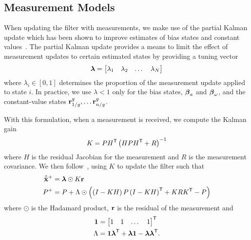 
\subsection{Measurement Models}
\label{sec:measurement_models}

When
updating the filter with measurements, we make use of the partial Kalman update
which has been shown to improve estimates of bias states and constant values~\cite{brink2017partial}. The partial Kalman update provides a
means to limit the effect of measurement updates to certain estimated
states by providing a tuning vector
\begin{equation}
  \boldsymbol{\mathrm{\lambda}} =
\begin{bmatrix}
  \lambda_1 & \lambda_2 & \dots & \lambda_N
\end{bmatrix}
\end{equation}
where $\lambda_i \in \left[ 0, 1\right]$ determines the proportion of the
measurement update applied to state $i$.
In practice, we use $\lambda < 1$ only for the
bias states, $\boldsymbol{\mathrm{\beta}}_a$ and $\boldsymbol{\mathrm{\beta}}_\omega$, and the
constant-value states $\vect{r}_{1/g}^{g}, \dots \vect{r}_{n/g}^{g}$.

With this formulation,
when a measurement is received, we compute the Kalman gain
\begin{equation}
  K = P H^{\mathsf{T}} \left(H P H^{\mathsf{T}} + R \right)^{-1}
\end{equation}
where $H$ is the residual Jacobian for the measurement and $R$ is the
measurement covariance. We then follow~\cite{brink2017partial}, using $K$ to update the filter such that
\begin{align}
  \hat{\tilde{\boldsymbol{\mathrm{x}}}}^{+} &= \boldsymbol{\mathrm{\lambda}} \odot K \boldsymbol{\mathrm{r}} \\
  P^{+} &= P + \Lambda \odot \left( \left(I - K H \right) P \left(I - K H
  \right)^{\mathsf{T}} + K R K^{\mathsf{T}} - P \right)
\end{align}
where $\odot$ is the Hadamard product, $\boldsymbol{\mathrm{r}}$ is the residual of the
measurement and
\begin{align}
  \boldsymbol{\mathrm{1}} &= \begin{bmatrix} 1 & 1 & \dots & 1 \end{bmatrix}^{\mathsf{T}} \\
  \Lambda &= \boldsymbol{\mathrm{1}} \boldsymbol{\mathrm{\lambda}}^{\mathsf{T}} + \boldsymbol{\mathrm{\lambda}} \boldsymbol{\mathrm{1}} -
  \boldsymbol{\mathrm{\lambda}} \boldsymbol{\mathrm{\lambda}}^{\mathsf{T}}.
\end{align}

